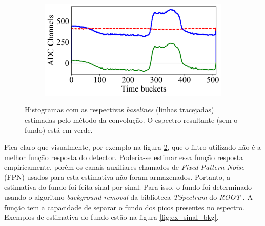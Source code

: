 \documentclass[a4paper,12pt,oneside]{book}
\begin{document}
\begin{figure}[H]
\begin{subfigure}[b]{0.45\textwidth}
        \caption{}
        \label{subfig:bs_fourier_3}
    \end{subfigure}%
    \hfill
    \begin{subfigure}[b]{0.45\textwidth}
        \centering
        \includegraphics[scale=0.45]{figs/bs_fourier_4.png}
        \caption{}
        \label{subfig:bs_fourier_4}
    \end{subfigure}
\caption{Histogramas com as respectivas \textit{baselines} (linhas tracejadas) estimadas pelo método da convolução. O espectro resultante (sem o fundo) está em verde.}
\label{fig:bs_fourier_exs}
\end{figure}


\par Fica claro que visualmente, por exemplo na figura \ref{subfig:bs_fourier_4}, que o filtro utilizado não é a melhor função resposta do detector. Poderia-se estimar essa função resposta empiricamente, porém os canais auxiliares chamados de \textit{Fixed Pattern Noise} (FPN)\cite{GET} usados para esta estimativa não foram armazenados. Portanto, a estimativa do fundo foi feita sinal por sinal\cite{FORTINO2022166497, GET}. Para isso, o fundo foi determinado usando o algoritmo \textit{background removal} da biblioteca \textit{TSpectrum} do \textit{ROOT} \cite{root}. A função tem a capacidade de separar o fundo dos picos presentes no espectro\cite{BKG_1, BKG_2, BKG_3}. Exemplos de estimativa do fundo estão na figura \ref{fig:ex_sinal_bkg}.

\end{document}
